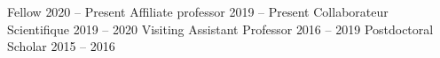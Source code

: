 
        {Fellow}
        {2020 -- Present}
		{Affiliate professor}
		{2019 -- Present}
		{Collaborateur Scientifique}
		{2019 -- 2020}
		{Visiting Assistant Professor}
		{2016 -- 2019}
		{Postdoctoral Scholar}
		{2015 -- 2016}